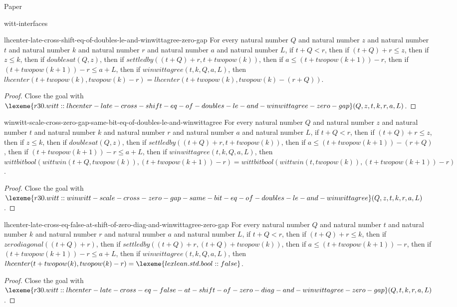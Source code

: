 \begin{lexlean}{Paper}
\begin{section}{witt-interfaces}
  \begin{theorem}{lhcenter-late-cross-shift-eq-of-doubles-le-and-winwittagree-zero-gap}
  For every natural number \(Q\) and natural number \(z\) and natural number \(t\) and natural number \(k\) and natural number \(r\) and natural number \(a\) and natural number \(L\), if \(t + Q < r\), then if \((t + Q) + r ≤ z\), then if \(z ≤ k\), then if \(doublesat(Q, z)\), then if \(settledby((t + Q) + r, t + twopow(k))\), then if \(a ≤ (t + twopow(k + 1)) - r\), then if \((t + twopow(k + 1)) - r ≤ a + L\), then if \(winwittagree(t, k, Q, a, L)\), then \(lhcenter(t + twopow(k), twopow(k) - r) = lhcenter(t + twopow(k), twopow(k) - (r + Q))\).
  \begin{proof}
  Close the goal with \(\lexeme{r30.witt::lhcenter-late-cross-shift-eq-of-doubles-le-and-winwittagree-zero-gap}(Q, z, t, k, r, a, L)\).
  \end{proof}
  \end{theorem}

  \begin{theorem}{winwitt-scale-cross-zero-gap-same-bit-eq-of-doubles-le-and-winwittagree}
  For every natural number \(Q\) and natural number \(z\) and natural number \(t\) and natural number \(k\) and natural number \(r\) and natural number \(a\) and natural number \(L\), if \(t + Q < r\), then if \((t + Q) + r ≤ z\), then if \(z ≤ k\), then if \(doublesat(Q, z)\), then if \(settledby((t + Q) + r, t + twopow(k))\), then if \(a ≤ (t + twopow(k + 1)) - (r + Q)\), then if \((t + twopow(k + 1)) - r ≤ a + L\), then if \(winwittagree(t, k, Q, a, L)\), then \(wittbitbool(wittwin(t + Q, twopow(k)), (t + twopow(k + 1)) - r) = wittbitbool(wittwin(t, twopow(k)), (t + twopow(k + 1)) - r)\).
  \begin{proof}
  Close the goal with \(\lexeme{r30.witt::winwitt-scale-cross-zero-gap-same-bit-eq-of-doubles-le-and-winwittagree}(Q, z, t, k, r, a, L)\).
  \end{proof}
  \end{theorem}

  \begin{theorem}{lhcenter-late-cross-eq-false-at-shift-of-zero-diag-and-winwittagree-zero-gap}
  For every natural number \(Q\) and natural number \(t\) and natural number \(k\) and natural number \(r\) and natural number \(a\) and natural number \(L\), if \(t + Q < r\), then if \((t + Q) + r ≤ k\), then if \(zerodiagonal((t + Q) + r)\), then if \(settledby((t + Q) + r, (t + Q) + twopow(k))\), then if \(a ≤ (t + twopow(k + 1)) - r\), then if \((t + twopow(k + 1)) - r ≤ a + L\), then if \(winwittagree(t, k, Q, a, L)\), then \(lhcenter(t + twopow(k), twopow(k) - r) = \lexeme{lexlean.std.bool::false}\).
  \begin{proof}
  Close the goal with \(\lexeme{r30.witt::lhcenter-late-cross-eq-false-at-shift-of-zero-diag-and-winwittagree-zero-gap}(Q, t, k, r, a, L)\).
  \end{proof}
  \end{theorem}


\end{section}
\end{lexlean}
